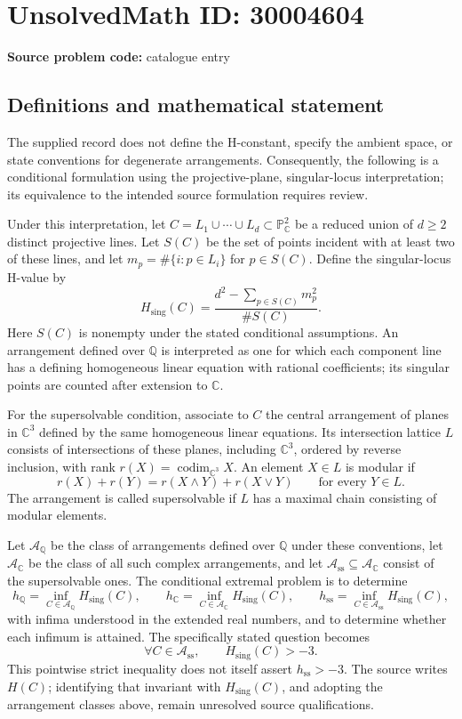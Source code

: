 \documentclass[11pt]{article}
\newcommand{\Q}{\mathbb{Q}}
\newcommand{\C}{\mathbb{C}}
\newcommand{\PP}{\mathbb{P}}
\begin{document}
\section*{UnsolvedMath ID: 30004604}
\textbf{Source problem code:} catalogue entry
\subsection{Definitions and mathematical statement}
The supplied record does not define the H-constant, specify the ambient space, or state conventions for degenerate arrangements. Consequently, the following is a conditional formulation using the projective-plane, singular-locus interpretation; its equivalence to the intended source formulation requires review.

Under this interpretation, let \(C=L_1\cup\cdots\cup L_d\subset\PP^2_{\C}\) be a reduced union of \(d\geq2\) distinct projective lines. Let \(S(C)\) be the set of points incident with at least two of these lines, and let \(m_p=\#\{i:p\in L_i\}\) for \(p\in S(C)\). Define the singular-locus H-value by
\[
 H_{\mathrm{sing}}(C)=\frac{d^2-\sum_{p\in S(C)}m_p^2}{\#S(C)}.
\]
Here \(S(C)\) is nonempty under the stated conditional assumptions. An arrangement defined over \(\Q\) is interpreted as one for which each component line has a defining homogeneous linear equation with rational coefficients; its singular points are counted after extension to \(\C\).

For the supersolvable condition, associate to \(C\) the central arrangement of planes in \(\C^3\) defined by the same homogeneous linear equations. Its intersection lattice \(L\) consists of intersections of these planes, including \(\C^3\), ordered by reverse inclusion, with rank \(r(X)=\operatorname{codim}_{\C^3}X\). An element \(X\in L\) is modular if
\[
 r(X)+r(Y)=r(X\wedge Y)+r(X\vee Y)\qquad\text{for every }Y\in L.
\]
The arrangement is called supersolvable if \(L\) has a maximal chain consisting of modular elements.

Let \(\mathcal A_{\Q}\) be the class of arrangements defined over \(\Q\) under these conventions, let \(\mathcal A_{\C}\) be the class of all such complex arrangements, and let \(\mathcal A_{\mathrm{ss}}\subseteq\mathcal A_{\C}\) consist of the supersolvable ones. The conditional extremal problem is to determine
\[
 h_{\Q}=\inf_{C\in\mathcal A_{\Q}}H_{\mathrm{sing}}(C),\qquad
 h_{\C}=\inf_{C\in\mathcal A_{\C}}H_{\mathrm{sing}}(C),\qquad
 h_{\mathrm{ss}}=\inf_{C\in\mathcal A_{\mathrm{ss}}}H_{\mathrm{sing}}(C),
\]
with infima understood in the extended real numbers, and to determine whether each infimum is attained. The specifically stated question becomes
\[
 \forall C\in\mathcal A_{\mathrm{ss}},\qquad H_{\mathrm{sing}}(C)>-3.
\]
This pointwise strict inequality does not itself assert \(h_{\mathrm{ss}}>-3\). The source writes \(H(C)\); identifying that invariant with \(H_{\mathrm{sing}}(C)\), and adopting the arrangement classes above, remain unresolved source qualifications.
\end{document}
